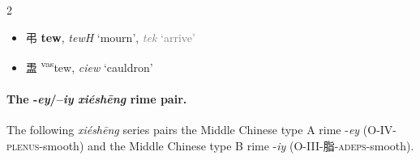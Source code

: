 \begin{multicols}{2}
\begin{minipage}{\columnwidth}
\begin{itemize}[leftmargin=*, labelsep=0.5em]
\end{itemize}
\end{minipage}

\medskip

\begin{itemize}

    \item {\Large{弔}} %
    {\large{\textbf{tew}}}, \textit{tewH} `mourn', \textcolor{gray}{\textit{tek} `arrive'}        %

    \item {\Large{盄}} %
    {\large{{\textsuperscript{vas}}tew}},
    \textit{ciew} `cauldron'        %

\end{itemize}

\end{multicols}


\paragraph{The -\textit{ey}/--\textit{iy} \textit{xiéshēng} rime pair.}
\label{par:ey-iy-XS-pair}
The following \textit{xiéshēng} series pairs the Middle Chinese type A rime -\textit{ey} (O-IV-\textsc{plenus}-smooth) and the Middle Chinese type B rime -\textit{iy} (O-III-脂-\textsc{adeps}-smooth). 


